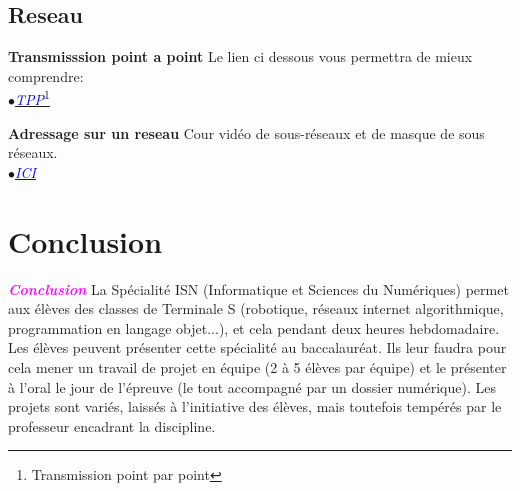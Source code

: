 \documentclass[a4paper, 12pt]{beamer}
\begin{document}
	\subsection{Reseau}
\begin{frame}
		\begin{block}{\textbf{Transmisssion point a point}}
		Le lien ci dessous vous permettra de mieux comprendre:\\
\href{http://abcdrfc.free.fr/rfc-vf/pdf/rfc1661.pdf}{$\bullet$\textcolor{blue}{\textit{TPP}}}\footnote{Transmission point par point}
	\end{block}
	\begin{block}{\textbf{Adressage sur un reseau}}
	Cour vidéo de sous-réseaux et de masque de sous réseaux.\\
\href{http://www.youtube.com/watch?v=zlzh1QcBb54}{$\bullet$\textcolor{blue}{\textit{ICI}}}
	\end{block}
	
\end{frame}
	\section{Conclusion}
		\begin{frame}
			\begin{block}{\textbf{\textit{\textcolor{magenta}{Conclusion}}}}
			 La Spécialité ISN (Informatique et Sciences du Numériques) permet aux élèves des classes de Terminale S (robotique, réseaux internet algorithmique, programmation en langage objet...), et cela pendant deux heures hebdomadaire.
Les élèves peuvent présenter cette spécialité au baccalauréat. Ils leur faudra pour cela mener un travail de projet en équipe (2 à 5 élèves par équipe) et le présenter à l’oral le jour de l’épreuve (le tout accompagné par un dossier numérique).
Les projets sont variés, laissés à l’initiative des élèves, mais toutefois tempérés par le professeur encadrant la discipline.			
			\end{block}
		\end{frame}
\end{document}

